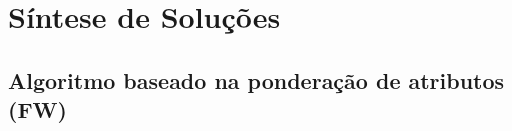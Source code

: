 \chapter[Síntese de Soluções]{Síntese de Soluções}
\label{chap:sintese_de_solucoes}


%

\section{Algoritmo baseado na ponderação de atributos (FW)} %
\label{sec:algoritmo_baseado_na_pondera_o_de_atributos_}

